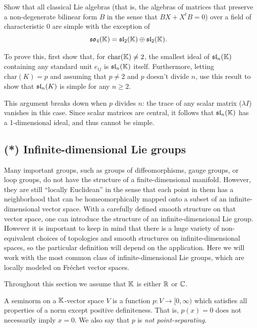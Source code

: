 \begin{xca}
    Show that all classical Lie algebras (that is, the algebras of matrices that preserve a non-degenerate bilinear form $B$ in the sense that $BX+X^tB=0$) over a field of characteristic 0 are simple with the exception of
    \[\mathfrak{so}_4(\mathbb{K})=\mathfrak{sl}_2(\mathbb{K})\oplus\mathfrak{sl}_2(\mathbb{K}).\]

    To prove this, first show that, for $\mathrm{char}(\mathbb{K})\neq 2$, the smallest ideal of $\mathfrak{sl}_n(\mathbb{K})$ containing any standard unit $e_{ij}$ is $\mathfrak{sl}_n(\mathbb{K})$ itself. Furthermore, letting $\mathrm{char}(K)=p$ and assuming that $p\neq 2$ and $p$ doesn't divide $n$, use this result to show that $\mathfrak{sl}_n(K)$ is simple for any $n\geq 2$. 

    This argument breaks down when $p$ divides $n$: the trace of any scalar matrix ($\lambda I$) vanishes in this case. Since scalar matrices are central, it follows that $\mathfrak{sl}_n(\mathbb{K})$ has a 1-dimensional ideal, and thus cannot be simple.
\end{xca}






\subsection{(*) Infinite-dimensional Lie groups}\label{sec: inf-dim groups}


Many important groups, such as groups of diffeomorphisms, gauge groups, or loop groups, do not have the structure of a finite-dimensional manifold. However, they are still ``locally Euclidean'' in the sense that each point in them has a neighborhood that can be homeomorphically mapped onto a subset of an infinite-dimensional vector space. With a carefully defined smooth structure on that vector space, one can introduce the structure of an infinite-dimensional Lie group. However it is important to keep in mind that there is a huge variety of non-equivalent choices of topologies and smooth structures on infinite-dimensional spaces, so the particular definition will depend on the application. Here we will work with the most common class of infinite-dimensional Lie groups, which are locally modeled on Fr\'echet vector spaces.

Throughout this section we assume that $\mathbb{K}$ is either $\mathbb{R}$ or $\mathbb{C}$.

\begin{defn}[Seminorm]
    A seminorm on a $\mathbb{K}$-vector space $V$ is a function $p:V\to [0,\infty)$ which satisfies all properties of a norm except positive definiteness. That is, $p(x)=0$ does not necessarily imply $x=0$. We also say that $p$ is \emph{not point-separating}.
\end{defn}

